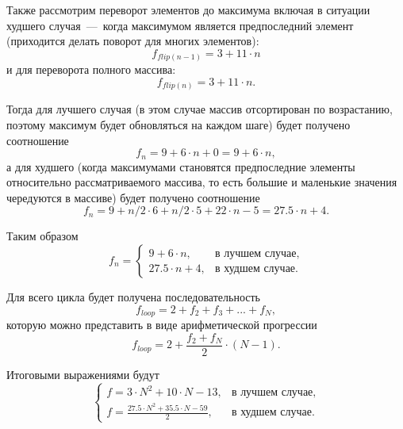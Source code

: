 Также рассмотрим переворот элементов до максимума включая в ситуации худшего случая~---~когда максимумом является предпоследний элемент (приходится делать поворот для многих элементов):
\begin{equation}
	f_{flip(n-1)} = 3 + 11 \cdot  n
\end{equation}
и для переворота полного массива:
\begin{equation}
	f_{flip(n)} = 3 + 11 \cdot  n.
\end{equation}

Тогда для лучшего случая (в этом случае массив отсортирован по возрастанию, поэтому максимум будет обновляться на каждом шаге) будет получено соотношение
\begin{equation}
	f_{n} = 9 + 6 \cdot  n + 0 = 9 + 6 \cdot n,
\end{equation}
а для худшего (когда максимумами становятся предпоследние элементы относительно рассматриваемого массива, то есть большие и маленькие значения чередуются в массиве) будет получено соотношение
\begin{equation}
	f_{n} = 9 + n/2 \cdot  6 + n/2 \cdot  5 + 22 \cdot  n - 5 = 27.5 \cdot  n + 4.
\end{equation}

Таким образом
\begin{equation}
	f_{n} = \begin{cases}
		9 + 6 \cdot  n,& \text{в лучшем случае}, \\
		27.5 \cdot  n + 4,& \text{в худшем случае}.
	\end{cases}
\end{equation}

Для всего цикла будет получена последовательность
\begin{equation}
	f_{loop} = 2 + f_{2} + f_{3} + ... + f_{N},
\end{equation}
которую можно представить в виде арифметической прогрессии
\begin{equation}
	f_{loop} = 2 + \frac{f_{2} + f_{N}}{2} \cdot (N - 1).
\end{equation}

Итоговыми выражениями будут
\begin{equation}
\begin{cases}
	f = 3 \cdot N^2 + 10 \cdot N - 13,& \text{в лучшем случае}, \\
	f = \frac{27.5 \cdot N^2 + 35.5 \cdot N - 59}{2},& \text{в худшем случае}.
\end{cases}
\end{equation}

